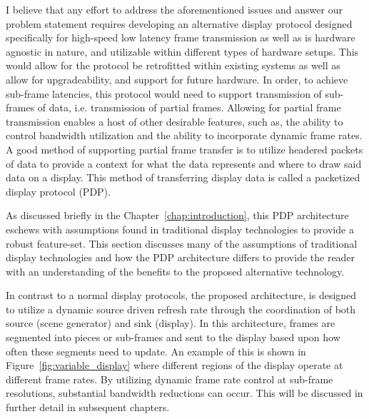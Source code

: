     I believe that any effort to address the aforementioned issues and answer our problem statement requires developing an alternative display protocol designed specifically for high-speed low latency frame transmission as well as is hardware agnostic in nature, and utilizable within different types of hardware setups. This would allow for the protocol be retrofitted within existing systems as well as allow for upgradeability, and support for future hardware. In order, to achieve sub-frame latencies, this protocol would need to support transmission of sub-frames of data, i.e. transmission of partial frames. Allowing for partial frame transmission enables a host of other desirable features, such as, the ability to control bandwidth utilization and the ability to incorporate dynamic frame rates. A good method of supporting partial frame transfer is to utilize headered packets of data to provide a context for what the data represents and where to draw said data on a display. This method of transferring display data is called a packetized display protocol (PDP).

    As discussed briefly in the Chapter~\ref{chap:introduction}, this PDP architecture eschews with assumptions found in traditional display technologies to provide a robust feature-set. This section discusses many of the assumptions of traditional display technologies and how the PDP architecture differs to provide the reader with an understanding of the benefits to the proposed alternative technology.

    In contrast to a normal display protocols, the proposed architecture, is designed to utilize a dynamic source driven refresh rate through the coordination of both source (scene generator) and sink (display). In this architecture, frames are segmented into pieces or sub-frames and sent to the display based upon how often these segments need to update. An example of this is shown in Figure~\ref{fig:variable_display} where different regions of the display operate at different frame rates. By utilizing dynamic frame rate control at sub-frame resolutions, substantial bandwidth reductions can occur. This will be discussed in further detail in subsequent chapters.


